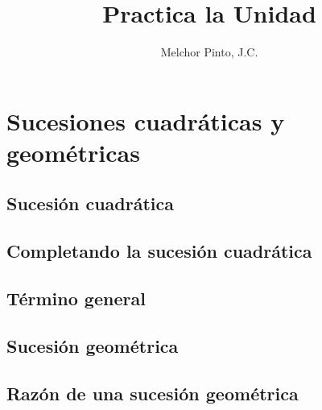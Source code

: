 \documentclass[12pt,addpoints]{repaso}
\title{Practica la Unidad}
\author{Melchor Pinto, J.C.}
\begin{document}
\INFO%
\section*   {Sucesiones cuadráticas y geométricas}
\subsection*{Sucesión cuadrática}

\begin{questions}
    \subsection*{Completando la sucesión cuadrática}

    \subsection*{Término general}
    \subsection*{Sucesión geométrica}
    \subsection*{Razón de una sucesión geométrica}

\end{questions}
\end{document}

